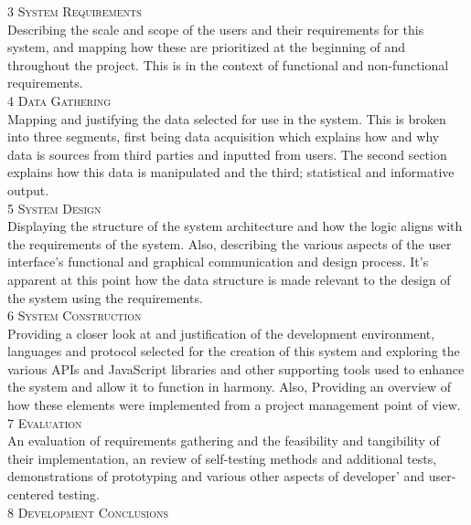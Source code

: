 \documentclass[11pt, english]{article}
\begin{document}
	\textsc{3 System Requirements}\\
	
	Describing the scale and scope of the users and their requirements for this system, and mapping how these are prioritized at the beginning of and throughout the project. This is in the context of functional and non-functional requirements.\\

	\textsc{4 Data Gathering}\\
	
	Mapping and justifying the data selected for use in the system. This is broken into three segments, first being data acquisition which explains how and why data is sources from third parties and inputted from users. The second section explains how this data is manipulated and the third; statistical and informative output.\\

	\textsc{5 System Design}\\
	
	Displaying the structure of the system architecture and how the logic aligns with the requirements of the system. Also, describing the various aspects of the user interface's functional and graphical communication and design process. It's apparent at this point how the data structure is made relevant to the design of the system using the requirements.\\

	\textsc{6 System Construction}\\
	
	Providing a closer look at and justification of the development environment, languages and protocol selected for the creation of this system and exploring the various APIs and JavaScript libraries and other supporting tools used to enhance the system and allow it to function in harmony. Also, Providing an overview of how these elements were implemented from a project management point of view.\\

	\textsc{7 Evaluation}\\
	
	An evaluation of requirements gathering and the feasibility and tangibility of their implementation, an review of self-testing methods and additional tests, demonstrations of prototyping and various other aspects of developer' and user-centered testing.\\

	\textsc{8 Development Conclusions}\\
\end{document}
